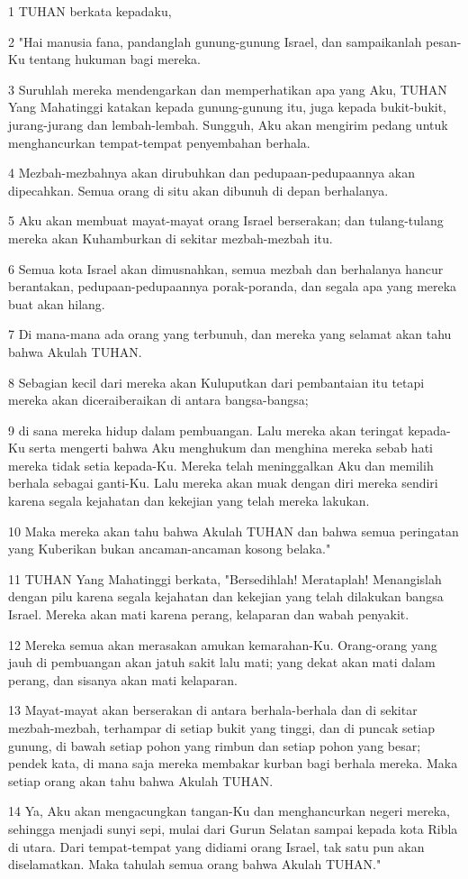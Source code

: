 \par 1 TUHAN berkata kepadaku,
\par 2 "Hai manusia fana, pandanglah gunung-gunung Israel, dan sampaikanlah pesan-Ku tentang hukuman bagi mereka.
\par 3 Suruhlah mereka mendengarkan dan memperhatikan apa yang Aku, TUHAN Yang Mahatinggi katakan kepada gunung-gunung itu, juga kepada bukit-bukit, jurang-jurang dan lembah-lembah. Sungguh, Aku akan mengirim pedang untuk menghancurkan tempat-tempat penyembahan berhala.
\par 4 Mezbah-mezbahnya akan dirubuhkan dan pedupaan-pedupaannya akan dipecahkan. Semua orang di situ akan dibunuh di depan berhalanya.
\par 5 Aku akan membuat mayat-mayat orang Israel berserakan; dan tulang-tulang mereka akan Kuhamburkan di sekitar mezbah-mezbah itu.
\par 6 Semua kota Israel akan dimusnahkan, semua mezbah dan berhalanya hancur berantakan, pedupaan-pedupaannya porak-poranda, dan segala apa yang mereka buat akan hilang.
\par 7 Di mana-mana ada orang yang terbunuh, dan mereka yang selamat akan tahu bahwa Akulah TUHAN.
\par 8 Sebagian kecil dari mereka akan Kuluputkan dari pembantaian itu tetapi mereka akan diceraiberaikan di antara bangsa-bangsa;
\par 9 di sana mereka hidup dalam pembuangan. Lalu mereka akan teringat kepada-Ku serta mengerti bahwa Aku menghukum dan menghina mereka sebab hati mereka tidak setia kepada-Ku. Mereka telah meninggalkan Aku dan memilih berhala sebagai ganti-Ku. Lalu mereka akan muak dengan diri mereka sendiri karena segala kejahatan dan kekejian yang telah mereka lakukan.
\par 10 Maka mereka akan tahu bahwa Akulah TUHAN dan bahwa semua peringatan yang Kuberikan bukan ancaman-ancaman kosong belaka."
\par 11 TUHAN Yang Mahatinggi berkata, "Bersedihlah! Merataplah! Menangislah dengan pilu karena segala kejahatan dan kekejian yang telah dilakukan bangsa Israel. Mereka akan mati karena perang, kelaparan dan wabah penyakit.
\par 12 Mereka semua akan merasakan amukan kemarahan-Ku. Orang-orang yang jauh di pembuangan akan jatuh sakit lalu mati; yang dekat akan mati dalam perang, dan sisanya akan mati kelaparan.
\par 13 Mayat-mayat akan berserakan di antara berhala-berhala dan di sekitar mezbah-mezbah, terhampar di setiap bukit yang tinggi, dan di puncak setiap gunung, di bawah setiap pohon yang rimbun dan setiap pohon yang besar; pendek kata, di mana saja mereka membakar kurban bagi berhala mereka. Maka setiap orang akan tahu bahwa Akulah TUHAN.
\par 14 Ya, Aku akan mengacungkan tangan-Ku dan menghancurkan negeri mereka, sehingga menjadi sunyi sepi, mulai dari Gurun Selatan sampai kepada kota Ribla di utara. Dari tempat-tempat yang didiami orang Israel, tak satu pun akan diselamatkan. Maka tahulah semua orang bahwa Akulah TUHAN."


